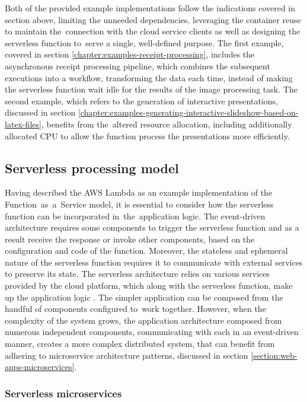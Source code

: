Both of the provided example implementations follow the indications covered in section above, limiting the unneeded dependencies, leveraging the container reuse to maintain the~connection with the cloud service clients as well as designing the serverless function to~serve a single, well-defined purpose.
The first example, covered in section \ref{chapter:examples-receipt-processing}, includes the asynchronous receipt processing pipeline, which combines the subsequent executions into a workflow, transforming the data each time, instead of making the serverless function wait idle for the results of the image processing task.
The second example, which refers to the generation of interactive presentations, discussed in section \ref{chapter:examples-generating-interactive-slideshow-based-on-latex-files}, benefits from the~altered resource allocation, including additionally allocated CPU to allow the function process the presentations more efficiently.

\subsection{Serverless processing model}

Having described the AWS Lambda as an example implementation of the Function~as~a~Service model, it is essential to consider how the serverless function can be incorporated in~the~application logic.
The event-driven architecture requires some components to trigger the serverless function and as a result receive the response or invoke other components, based on the configuration and code of the function.
Moreover, the stateless and ephemeral nature of the serverless function requires it to communicate with external services to preserve its state.
The serverless architecture relies on various services provided by the cloud platform, which along with the serverless function, make up the application logic \cite{EvaluationOfServerlessApplicationProgrammingModel}.
The simpler application can be composed from the handful of components configured to~work together. 
However, when the complexity of the system grows, the application architecture composed from numerous independent components, communicating with each in an event-driven manner, creates a more complex distributed system, that can benefit from adhering to microservice architecture patterns, discussed in section \ref{section:web-apps-microservices}.

\subsubsection{Serverless microservices}

